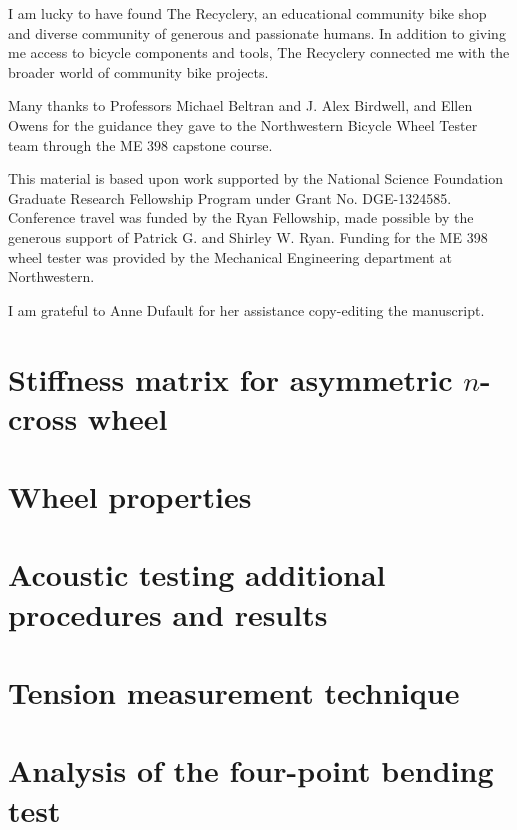 \documentclass{nuthesis}
\begin{document}
I am lucky to have found The Recyclery, an educational community bike shop and diverse community of generous and passionate humans. In addition to giving me access to bicycle components and tools, The Recyclery connected me with the broader world of community bike projects.

Many thanks to Professors Michael Beltran and J. Alex Birdwell, and Ellen Owens for the guidance they gave to the Northwestern Bicycle Wheel Tester team through the ME 398 capstone course.

This material is based upon work supported by the National Science Foundation Graduate Research Fellowship Program under Grant No. DGE-1324585. Conference travel was funded by the Ryan Fellowship, made possible by the generous support of Patrick G. and Shirley W. Ryan. Funding for the ME 398 wheel tester was provided by the Mechanical Engineering department at Northwestern.

I am grateful to Anne Dufault for her assistance copy-editing the manuscript.






\appendix
{}

\printunsrtglossary[type=symbols, style=long, title={List of symbols}]

\chapter{Stiffness matrix for asymmetric $n$-cross wheel}
\label{app:kbar_asymm}


\chapter{Wheel properties}
\label{app:wheel_properties}


\chapter{Acoustic testing additional procedures and results}
\label{app:acoustic_testing}


\chapter{Tension measurement technique}
\label{app:tension_measurement}


\chapter{Analysis of the four-point bending test}
\label{app:four_pt_bend}

\end{document}
